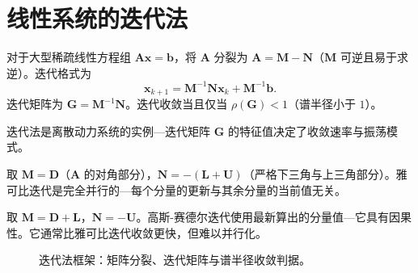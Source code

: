 \section{\texorpdfstring{线性系统的迭代法}{线性系统的迭代法}}

\begin{definition}[迭代法的基本框架]\label{def:iterative_method}
对于大型稀疏线性方程组 $\mathbf{A}\mathbf{x} = \mathbf{b}$，将 $\mathbf{A}$ 分裂为 $\mathbf{A} = \mathbf{M} - \mathbf{N}$（$\mathbf{M}$ 可逆且易于求逆）。迭代格式为
\[
\mathbf{x}_{k+1} = \mathbf{M}^{-1} \mathbf{N} \mathbf{x}_k + \mathbf{M}^{-1} \mathbf{b}.
\]
迭代矩阵为 $\mathbf{G} = \mathbf{M}^{-1} \mathbf{N}$。迭代收敛当且仅当 $\rho(\mathbf{G}) < 1$（谱半径小于 $1$）。

迭代法是离散动力系统的实例---迭代矩阵 $\mathbf{G}$ 的特征值决定了收敛速率与振荡模式。
\end{definition}

\begin{definition}[雅可比迭代]\label{def:jacobi_iteration}
取 $\mathbf{M} = \mathbf{D}$（$\mathbf{A}$ 的对角部分），$\mathbf{N} = -(\mathbf{L} + \mathbf{U})$（严格下三角与上三角部分）。雅可比迭代是完全并行的---每个分量的更新与其余分量的当前值无关。
\end{definition}

\begin{definition}[高斯-赛德尔迭代]\label{def:gauss_seidel}
取 $\mathbf{M} = \mathbf{D} + \mathbf{L}$，$\mathbf{N} = -\mathbf{U}$。高斯-赛德尔迭代使用最新算出的分量值---它具有因果性。它通常比雅可比迭代收敛更快，但难以并行化。
\end{definition}

\begin{figure}[htbp]
\centering
{}
\caption{迭代法框架：矩阵分裂、迭代矩阵与谱半径收敛判据。}
\label{fig:iterative_method}
\end{figure}

